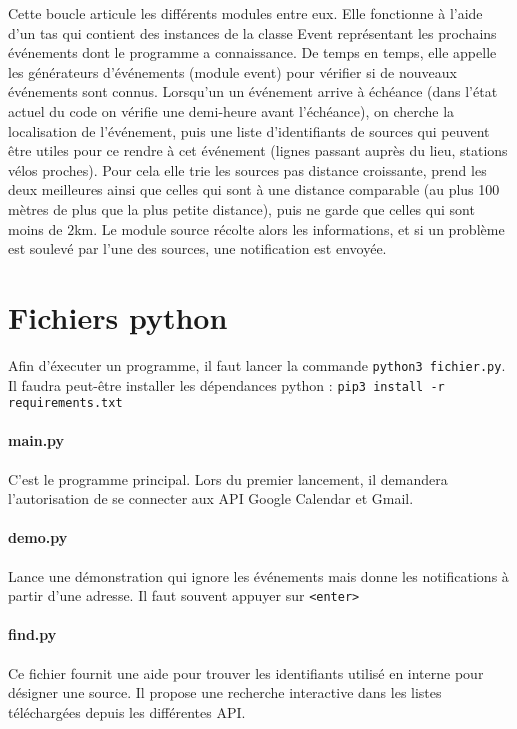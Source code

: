 \documentclass[a4paper, 8pt]{article}
\begin{document}
Cette boucle articule les différents modules entre eux.
Elle fonctionne à l'aide d'un tas qui contient des instances de la classe Event
représentant les prochains événements dont le programme a connaissance.
De temps en temps, elle appelle les générateurs d'événements (module event) pour
vérifier si de nouveaux événements sont connus.
Lorsqu'un un événement arrive à échéance (dans l'état actuel du code on vérifie une
demi-heure avant l'échéance), on cherche la localisation de l'événement, puis
une liste d'identifiants de sources qui peuvent être utiles pour ce rendre à cet
événement (lignes passant auprès du lieu, stations vélos proches).
Pour cela elle trie les sources pas distance croissante, prend les deux meilleures
ainsi que celles qui sont à une distance comparable (au plus 100 mètres de plus
que la plus petite distance),
puis ne garde que celles qui sont moins de $2$km.
Le module source récolte alors les informations, et si un problème est soulevé
par l'une des sources, une notification est envoyée.


\section{Fichiers python}

Afin d'éxecuter un programme, il faut lancer la commande
\texttt{python3 fichier.py}.
Il faudra peut-être installer les dépendances python :
\texttt{pip3 install -r requirements.txt}

\paragraph{main.py} C'est le programme principal. Lors du premier lancement,
il demandera l'autorisation de se connecter aux API Google Calendar et Gmail.

\paragraph{demo.py} Lance une démonstration qui ignore les événements mais donne les
notifications à partir d'une adresse. Il faut souvent appuyer sur
\texttt{<enter>}

\paragraph{find.py} Ce fichier fournit une aide
pour trouver les identifiants utilisé en interne pour désigner une source.
Il propose une recherche interactive dans les listes téléchargées depuis les
différentes API.
\end{document}

